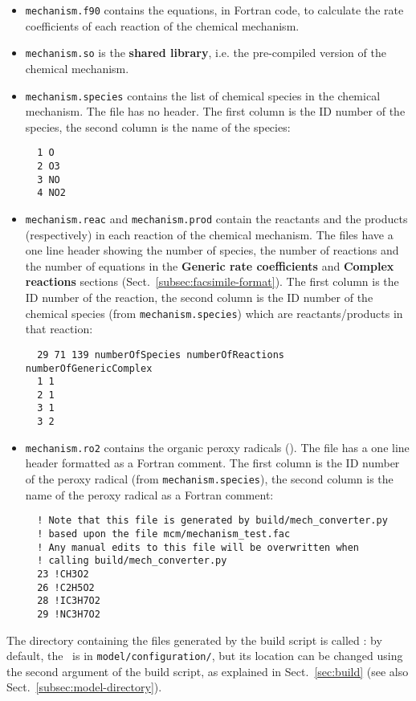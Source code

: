 \begin{itemize}
\item \texttt{mechanism.f90} contains the equations, in Fortran code,
  to calculate the rate coefficients of each reaction of the chemical
  mechanism.
\item \texttt{mechanism.so} is the \textbf{shared library}, i.e. the
  pre-compiled version of the chemical mechanism.
\item \texttt{mechanism.species} contains the list of chemical species
  in the chemical mechanism. The file has no header. The first column
  is the ID number of the species, the second column is the
  name of the species:
  \begin{verbatim}
  1 O
  2 O3
  3 NO
  4 NO2
  \end{verbatim}
\item \texttt{mechanism.reac} and \texttt{mechanism.prod} contain the
  reactants and the products (respectively) in each reaction of the
  chemical mechanism. The files have a one line header showing the
  number of species, the number of reactions and the number of
  equations in the \textbf{Generic rate coefficients} and
  \textbf{Complex reactions} sections (Sect.~\ref{subsec:facsimile-format}).
  The first column is the ID number of the reaction, the second
  column is the ID number of the chemical species (from
  \texttt{mechanism.species}) which are reactants/products in that
  reaction:
  \begin{verbatim}
  29 71 139 numberOfSpecies numberOfReactions numberOfGenericComplex
  1 1
  2 1
  3 1
  3 2
\end{verbatim}
\item \texttt{mechanism.ro2} contains the organic peroxy radicals
  (). The file has a one line header formatted as a Fortran
  comment. The first column is the ID number of the peroxy
  radical (from \texttt{mechanism.species}), the second column is the
  name of the peroxy radical as a Fortran comment:
  \begin{verbatim}
  ! Note that this file is generated by build/mech_converter.py
  ! based upon the file mcm/mechanism_test.fac
  ! Any manual edits to this file will be overwritten when
  ! calling build/mech_converter.py
  23 !CH3O2
  26 !C2H5O2
  28 !IC3H7O2
  29 !NC3H7O2
  \end{verbatim}
\end{itemize}

The directory containing the files generated by the build script is
called \sharedir: by default, the \sharedir\ is in
\texttt{model/configuration/}, but its location can be changed using
the second argument of the build script, as explained in
Sect.~\ref{sec:build} (see also Sect.~\ref{subsec:model-directory}).

